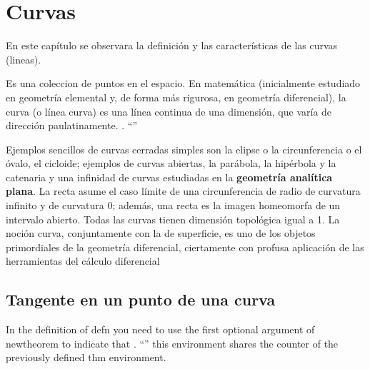 \chapter{Curvas}
\setcounter{page}{1}






En este capítulo se observara la definición y las características de las curvas (lineas).


\begin{defn}[Curva]
Es una coleccion de puntos en el espacio. En matemática (inicialmente estudiado en geometría elemental y, de forma más rigurosa, en geometría diferencial), la curva (o línea curva) es una línea continua de una dimensión, que varía de dirección paulatinamente. \cite{hilbert2020geometry}. ``''
\end{defn}

Ejemplos sencillos de curvas cerradas simples son la elipse o la circunferencia o el óvalo, el cicloide; ejemplos de curvas abiertas, la parábola, la hipérbola y la catenaria y una infinidad de curvas estudiadas en la \textbf{geometría analítica plana}. La recta asume el caso límite de una circunferencia de radio de curvatura infinito y de curvatura 0; además, una recta es la imagen homeomorfa de un intervalo abierto. Todas las curvas tienen dimensión topológica igual a 1. La noción curva, conjuntamente con la de superficie, es uno de los objetos primordiales de la geometría diferencial, ciertamente con profusa aplicación de las herramientas del cálculo diferencial

\section{Tangente en un punto de una curva}
\begin{defn}[Tangente] In the definition of defn you need to use the first optional argument of  newtheorem to indicate that \cite{hilbert2020geometry}. ``''  this environment shares the counter of the previously defined thm environment.\end{defn}
\cite{reyes} \cite{www}


